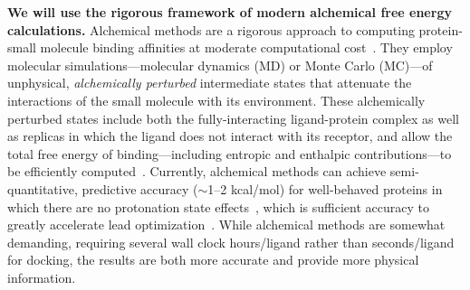 \documentclass[11pt]{article}
\begin{document}
{\bf We will use the rigorous framework of modern alchemical free energy calculations.}
Alchemical methods are a rigorous approach to computing protein-small molecule binding affinities at moderate computational cost~\cite{tembe-mccammon:comput-chem:1984:alchemical-free-energy-calculations,shirts-mobley-chodera:2007:annu-rep-comput-chem:prime-time,essex:j-med-chem:2008:estrogen-receptor,essex:jcamd:2010:free-energy-review,gallicchio-levy:curr-opin-struct-biol:2011:free-energy-review,chodera:curr-opin-struct-biol:2011:drug-discovery}.
They employ molecular simulations---molecular dynamics (MD) or Monte Carlo (MC)---of unphysical, \emph{alchemically perturbed} intermediate states that attenuate the interactions of the small molecule with its environment.  
These alchemically perturbed states include both the fully-interacting ligand-protein complex as well as replicas in which the ligand does not interact with its receptor, and allow the total free energy of binding---including entropic and enthalpic contributions---to be efficiently computed~\cite{essex:jcamd:2010:free-energy-review,gallicchio-levy:curr-opin-struct-biol:2011:free-energy-review,chodera:curr-opin-struct-biol:2011:drug-discovery}.  
Currently, alchemical methods can achieve semi-quantitative, predictive accuracy ($\sim$1--2 kcal/mol) for well-behaved proteins in which there are no protonation state effects~\cite{shirts-mobley-chodera:2007:annu-rep-comput-chem:prime-time,chodera:curr-opin-struct-biol:2011:drug-discovery,abel:jacs:2015:fep-plus}, which is sufficient accuracy to greatly accelerate lead optimization~\cite{shirts-mobley-brown:2009:sbdd}.
While alchemical methods are somewhat demanding, requiring several wall clock hours/ligand rather than seconds/ligand for docking, the results are both more accurate and provide more physical information.
\end{document}
